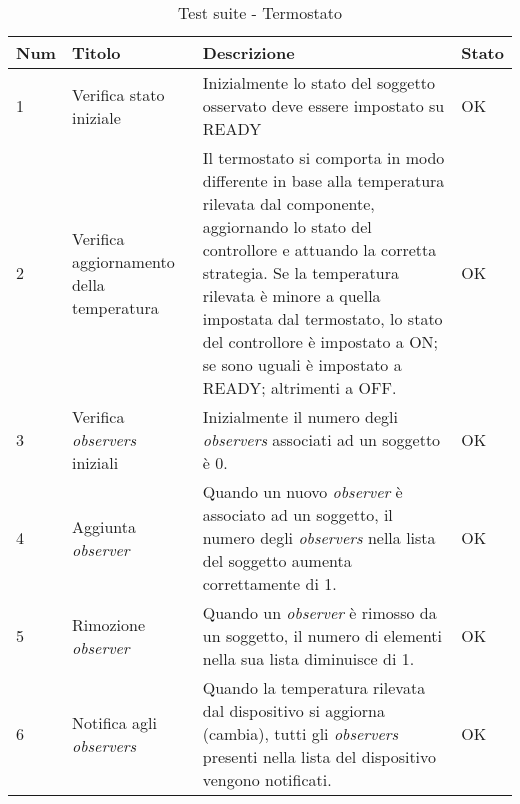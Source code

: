 \begin{table}[h!]
\caption{Test suite - Termostato}
\centering %
\begin{tabular}{|p{1cm}|p{3cm}|p{7cm}|p{1cm}|} %
\hline\hline %
\textbf{Num} & \textbf{Titolo} & \textbf{Descrizione} & \textbf{Stato} \\ [0.5ex] %
\hline %
1 & Verifica stato iniziale & Inizialmente lo stato del soggetto osservato deve essere impostato su READY & OK \\ \hline%
2 & Verifica aggiornamento della temperatura & Il termostato si comporta in modo differente in base alla temperatura rilevata dal componente, aggiornando lo stato del controllore e attuando la corretta strategia. Se la temperatura rilevata è minore a quella impostata dal termostato, lo stato del controllore è impostato a ON; se sono uguali è impostato a READY; altrimenti a OFF. & OK \\ \hline
3 & Verifica \emph{observers} iniziali & Inizialmente il numero degli \emph{observers} associati ad un soggetto è 0. & OK \\ \hline
4 & Aggiunta \emph{observer} & Quando un nuovo \emph{observer} è associato ad un soggetto, il numero degli \emph{observers} nella lista del soggetto aumenta correttamente di 1. & OK \\ \hline
5 & Rimozione \emph{observer} & Quando un \emph{observer} è rimosso da un soggetto, il numero di elementi nella sua lista diminuisce di 1. & OK \\ \hline
6 & Notifica agli \emph{observers} & Quando la temperatura rilevata dal dispositivo si aggiorna (cambia), tutti gli \emph{observers} presenti nella lista del dispositivo vengono notificati. & OK \\ [1ex] %
\hline %
\end{tabular}
\label{table:observerstrategy} 
\end{table}

